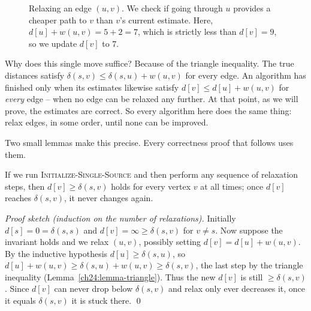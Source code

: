 \begin{figure}[htbp]
\centering
{}
\caption{Relaxing an edge $(u,v)$. We check if going through $u$ provides a cheaper path to $v$ than $v$'s current estimate. Here, $d[u] + w(u,v) = 5 + 2 = 7$, which is strictly less than $d[v]=9$, so we update $d[v]$ to $7$.}
\label{ch24:fig-relax}
\end{figure}

Why does this single move suffice? Because of the triangle inequality. The true
distances satisfy $\delta(s,v) \le \delta(s,u) + w(u,v)$ for every edge. An
algorithm has finished only when its estimates likewise satisfy
$d[v] \le d[u] + w(u,v)$ for \emph{every} edge -- when no edge can be relaxed any
further. At that point, as we will prove, the estimates are correct. So every
algorithm here does the same thing: relax edges, in some order, until none can be improved.

Two small lemmas make this precise. Every correctness proof that follows uses
them.

\begin{lemma}\label{ch24:lemma-upperbound}
If we run \textsc{Initialize-Single-Source} and then perform any sequence of
relaxation steps, then $d[v] \ge \delta(s,v)$ holds for every vertex $v$ at all
times; once $d[v]$ reaches $\delta(s,v)$, it never changes again.
\end{lemma}

\begin{formalbox}
\emph{Proof sketch (induction on the number of relaxations).} Initially
$d[s]=0=\delta(s,s)$ and $d[v]=\infty\ge\delta(s,v)$ for $v\ne s$. Now suppose the
invariant holds and we relax $(u,v)$, possibly setting
$d[v] = d[u] + w(u,v)$. By the inductive hypothesis $d[u]\ge\delta(s,u)$, so
$d[u]+w(u,v) \ge \delta(s,u)+w(u,v) \ge \delta(s,v)$, the last step by the
triangle inequality (Lemma~\ref{ch24:lemma-triangle}). Thus the new $d[v]$ is
still $\ge\delta(s,v)$. Since $d[v]$ can never drop below $\delta(s,v)$ and relax
only ever decreases it, once it equals $\delta(s,v)$ it is stuck there. \qed
\end{formalbox}

